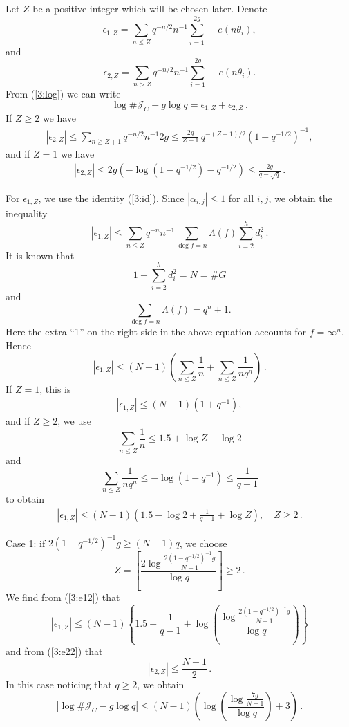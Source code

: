 \documentclass[12pt]{amsart}
\theoremstyle{plain}
\newcommand{\J}{\mathcal J}
\begin{document}
Let $Z$ be a positive integer which will be chosen later. Denote
\[\epsilon_{1,Z}=\sum_{n \le Z} q^{-n/2}n^{-1} \sum_{i=1}^{2g} -e(n \theta_i),\]
and
\[\epsilon_{2,Z}=\sum_{n > Z} q^{-n/2}n^{-1} \sum_{i=1}^{2g} -e(n \theta_i).\]
From (\ref{3:log}) we can write
\[\log \#\J_C-g \log q=\epsilon_{1,Z}+\epsilon_{2,Z}\,.\]
If $Z \ge 2$ we have
\begin{eqnarray} \label{3:e22} |\epsilon_{2,Z}| \le \sum_{n \ge Z+1}q^{-n/2}n^{-1}2g \le \frac{2g}{Z+1}\,q^{-(Z+1)/2}\left(1-q^{-1/2}\right)^{-1},\end{eqnarray}
and if $Z=1$ we have
\begin{eqnarray} \label{3:e21} |\epsilon_{2,Z}| \le 2g  \left(-\log\left(1-q^{-1/2}\right)-q^{-1/2}\right) \le \frac{2g}{q-\sqrt{q}}\,.\end{eqnarray}

For $\epsilon_{1,Z}$, we use the identity (\ref{3:id}). Since $|\alpha_{i,j}| \le 1$ for all $i,j$, we obtain the inequality
\[|\epsilon_{1,Z}| \le \sum_{n \le Z} q^{-n}n^{-1} \sum_{\deg f=n}\Lambda(f) \sum_{i=2}^h d_i^2\,.\]
It is known that
\[1+\sum_{i=2}^h d_i^2=N=\# G\]
and
\[\sum_{\deg f=n}\Lambda(f)=q^n+1.\]
Here the extra ``1'' on the right side in the above equation accounts for $f=\infty^n$. Hence
\[|\epsilon_{1,Z}| \le (N-1) \left(\sum_{n \le Z}\frac{1}{n}+\sum_{n \le Z}\frac{1}{nq^n}\right)\,.\]
If $Z=1$, this is
\begin{eqnarray} \label{3:e11} |\epsilon_{1,Z}| \le (N-1)\left(1+q^{-1}\right), \end{eqnarray}
and if $Z \ge 2$, we use
\[\sum_{n \le Z}\frac{1}{n} \le 1.5+\log Z-\log 2\]
and
\[\sum_{n \le Z}\frac{1}{nq^n} \le -\log \left(1-q^{-1}\right) \le \frac{1}{q-1}\]
to obtain
\begin{eqnarray} \label{3:e12} |\epsilon_{1,Z}| \le (N-1) \left(1.5-\log 2+\frac{1}{q-1}+\log Z\right),\quad Z \ge 2\,.\end{eqnarray}

Case 1: if $2\left(1-q^{-1/2}\right)^{-1}g \ge (N-1)q$, we choose
\[Z=\left[\frac{2 \log \frac{2\left(1-q^{-1/2}\right)^{-1}g}{N-1}}{\log q}\right] \ge 2\,.\]
We find from (\ref{3:e12}) that
\[|\epsilon_{1,Z}| \le (N-1) \left\{1.5+\frac{1}{q-1}+\log \left(\frac{\log \frac{2\left(1-q^{-1/2}\right)^{-1}g}{N-1}}{\log q}\right)\right\}\]
and from (\ref{3:e22}) that
\[|\epsilon_{2,Z}| \le \frac{N-1}{2}\,.\]
In this case noticing that $q \ge 2$, we obtain
\[\left|\log \#\J_C-g \log q\right|\le (N-1) \left(\log \left(\frac{\log \frac{7g}{N-1}}{\log q}\right)+3\right)\,.\]
\end{document}
